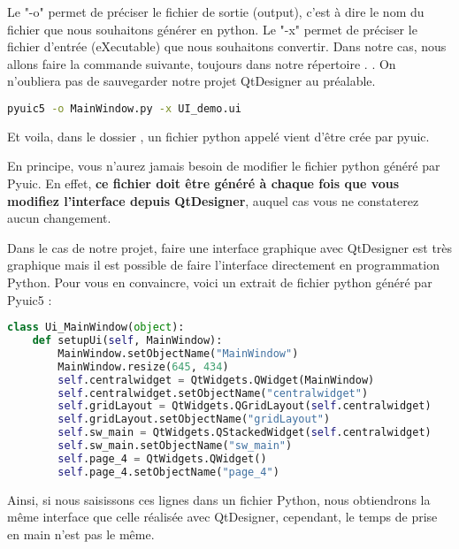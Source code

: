 {Le "-o" permet de préciser le fichier de sortie (output), c'est à dire le nom du fichier que nous souhaitons générer en python. \newline \newline
Le "-x" permet de préciser le fichier d'entrée (eXecutable) que nous souhaitons convertir. \newline \newline
Dans notre cas, nous allons faire la commande suivante, toujours dans notre répertoire . \newline.
On n'oubliera pas de sauvegarder notre projet QtDesigner au préalable.
\begin{lstlisting}[language=bash]
pyuic5 -o MainWindow.py -x UI_demo.ui
\end{lstlisting}
Et voila, dans le dossier , un fichier python appelé  vient d'être crée par pyuic. \newline

En  principe,  vous  n’aurez  jamais  besoin  de  modifier  le  fichier  python généré par Pyuic. En  effet, \textbf{{\color{red}ce  fichier  doit être généré à chaque  fois  que  vous  modifiez l’interface depuis QtDesigner}}, auquel cas vous ne constaterez aucun changement. \newline

Dans le cas de notre projet, faire une interface graphique avec QtDesigner est très graphique mais il est possible de faire l'interface directement en programmation Python. \newline
Pour vous en convaincre, voici un extrait de fichier python généré par Pyuic5 : \newline

\begin{lstlisting}[language=python]
class Ui_MainWindow(object):
    def setupUi(self, MainWindow):
        MainWindow.setObjectName("MainWindow")
        MainWindow.resize(645, 434)
        self.centralwidget = QtWidgets.QWidget(MainWindow)
        self.centralwidget.setObjectName("centralwidget")
        self.gridLayout = QtWidgets.QGridLayout(self.centralwidget)
        self.gridLayout.setObjectName("gridLayout")
        self.sw_main = QtWidgets.QStackedWidget(self.centralwidget)
        self.sw_main.setObjectName("sw_main")
        self.page_4 = QtWidgets.QWidget()
        self.page_4.setObjectName("page_4")
\end{lstlisting}
Ainsi, si nous saisissons ces lignes dans un fichier Python, nous obtiendrons la même interface que celle réalisée avec QtDesigner, cependant, le temps de prise en main n'est pas le même. \newline

}
